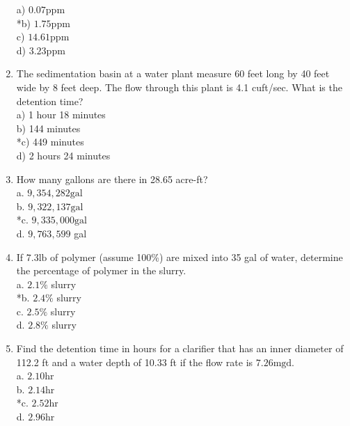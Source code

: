 \begin{enumerate}
a) $0.07 \mathrm{ppm}$\\
*b) $1.75 \mathrm{ppm}$\\
c) $14.61 \mathrm{ppm}$\\
d) $3.23 \mathrm{ppm}$\\
\item The sedimentation basin at a water plant measure 60 feet long by 40 feet wide by 8 feet deep. The flow through this plant is 4.1 cuft/sec. What is the detention time?\\
a) 1 hour 18 minutes\\
b) 144 minutes\\
*c) 449 minutes\\
d) 2 hours 24 minutes\\
\item How many gallons are there in 28.65 acre-ft?\\
a. $9,354,282 \mathrm{gal}$\\
b. $9,322,137 \mathrm{gal}$\\
*c. $9,335,000 \mathrm{gal}$\\
d. $9,763,599$ gal\\
\item If $7.3 \mathrm{lb}$ of polymer (assume 100\%) are mixed into 35 gal of water, determine the percentage of polymer in the slurry.\\
a. $2.1 \%$ slurry\\
*b. $2.4 \%$ slurry\\
c. $2.5 \%$ slurry\\
d. $2.8 \%$ slurry\\
\item Find the detention time in hours for a clarifier that has an inner diameter of 112.2 ft and a water depth of 10.33 ft if the flow rate is $7.26 \mathrm{mgd}$.\\
a. $2.10 \mathrm{hr}$\\
b. $2.14 \mathrm{hr}$\\
*c. $2.52 \mathrm{hr}$\\
d. $2.96 \mathrm{hr}$ \\
\end{enumerate}

